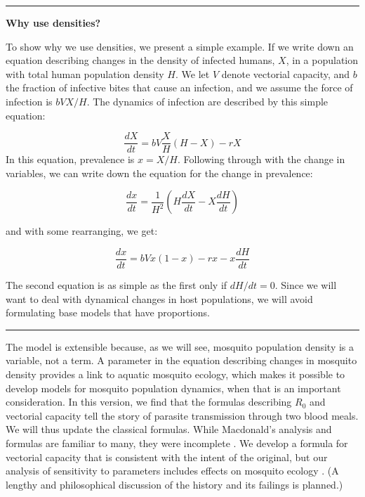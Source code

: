 \documentclass[
]{book}
\begin{document}
\begin{center}\rule{0.5\linewidth}{0.5pt}\end{center}

\textbf{Why use densities?}

To show why we use densities, we present a simple example. If we write down an equation describing changes in the density of infected humans, \(X\), in a population with total human population density \(H\). We let \(V\) denote vectorial capacity, and \(b\) the fraction of infective bites that cause an infection, and we assume the force of infection is \(bVX/H\). The dynamics of infection are described by this simple equation:

\[\frac{dX}{dt} = bV\frac{X}{H}(H-X)-rX\]
In this equation, prevalence is \(x = X/H.\) Following through with the change in variables, we can write down the equation for the change in prevalence:

\[\frac{dx}{dt} = \frac{1}{H^2} \left(H \frac{dX}{dt} - X \frac{dH}{dt} \right)\]

and with some rearranging, we get:

\[\frac{dx}{dt} = bVx(1-x)-rx -x \frac{dH}{dt}\]

The second equation is as simple as the first only if \(dH/dt=0\). Since we will want to deal with dynamical changes in host populations, we will avoid formulating base models that have proportions.

\begin{center}\rule{0.5\linewidth}{0.5pt}\end{center}

The model is extensible because, as we will see, mosquito population density is a variable, not a term. A parameter in the equation describing changes in mosquito density provides a link to aquatic mosquito ecology, which makes it possible to develop models for mosquito population dynamics, when that is an important consideration. In this version, we find that the formulas describing \(R_0\) and vectorial capacity tell the story of parasite transmission through two blood meals. We will thus update the classical formulas. While Macdonald's analysis and formulas are familiar to many, they were incomplete \autocite{SmithDL2004Statics,SmithDL2021OldMosquitoes}. We develop a formula for vectorial capacity that is consistent with the intent of the original, but our analysis of sensitivity to parameters includes effects on mosquito ecology \autocite{BradyOJ2015AdultVector}. (A lengthy and philosophical discussion of the history and its failings is planned.)
\end{document}

